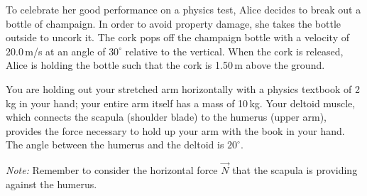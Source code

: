 \documentclass[letterpaper,addpoints,answers]{exam}
\begin{document}
\begin{questions}
\pagebreak

\question

To celebrate her good performance on a physics test, Alice decides to break out a bottle of champaign.  In order to avoid property damage, she takes the bottle outside to uncork it.  The cork pops off the champaign bottle with a velocity of 20.0\,m/s at an angle of $30^\circ$ relative to the vertical.  When the cork is released, Alice is holding the bottle such that the cork is 1.50\,m above the ground.

\pagebreak

\question
You are holding out your stretched arm horizontally with a physics textbook of 2\,kg in your hand; your entire arm itself has a mass of 10\,kg. Your deltoid muscle, which connects the scapula (shoulder blade) to the humerus (upper arm), provides the force necessary to hold up your arm with the book in your hand.\footnotemark{} The angle between the humerus and the deltoid is $20^\circ$.

\emph{Note:} Remember to consider the horizontal force $\vec{N}$ that the scapula is providing against the humerus. 



\end{questions}
\end{document}

